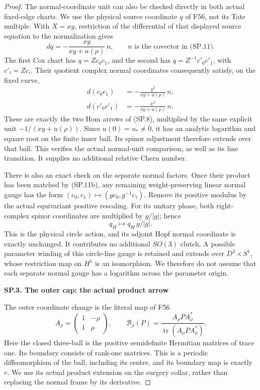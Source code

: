 \begin{proof}
The normal-coordinate unit can also be checked directly in both
actual fixed-edge charts. We use the physical source coordinate
\(q\) of F56, not its Tate multiple. With \(X=xy\), restriction
of the differential of that displayed source equation to the
normalization gives
\[
 dq=-\frac{xy}{xy+u(\rho)}\,n,
 \qquad n\text{ is the covector in (SP.11)}.              \tag{SP.11a}
\]
The first Cox chart has \(q=Zc_0c_1\), and the second has
\(q=Z^{-1}c'_0c'_1\), with \(c'_i=Zc_i\). Their quotient
complex normal coordinates consequently satisfy, on the fixed curve,
\[
 \begin{aligned}
 d(c_0c_1)&=-\frac{y^2}{xy+u(\rho)}\,n,\\
 d(c'_0c'_1)&=-\frac{x^2}{xy+u(\rho)}\,n.
 \end{aligned}                                             \tag{SP.11b}
\]
These are exactly the two Hom arrows of (SP.8), multiplied by the
same explicit unit \(-1/(xy+u(\rho))\). Since \(u(0)=u_*\ne0\),
it has an analytic logarithm and square root on the finite inner
ball. Its spinor adjustment therefore extends over that ball. This
verifies the actual normal-unit comparison, as well as its line
transition. It supplies no additional relative Chern number.

There is also an exact check on the separate normal factors. Once
their product has been matched by (SP.11b), any remaining
weight-preserving linear normal gauge has the form
\((c_0,c_1)\mapsto(g c_0,g^{-1}c_1)\). Remove its positive
modulus by the actual equivariant positive rescaling. For its unitary
phase, both right-complex spinor coordinates are multiplied by
\(g/|g|\); hence
\[
                  q_H\longmapsto q_H\,g/|g|.             \tag{SP.11c}
\]
This is the physical circle action, and its adjoint Hopf normal
coordinate is exactly unchanged. It contributes no additional
\(SO(3)\) clutch. A possible parameter winding of this circle-line
gauge is retained and extends over \(D^3\times S^1\), whose
restriction map on \(H^1\) is an isomorphism. We therefore do not
assume that each separate normal gauge has a logarithm across the
parameter origin.

\par

\medskip\noindent\textbf{SP.3. The outer cap: the actual product arrow}

\par\nobreak

The outer coordinate change is the literal map of F56
\[
 A_\rho=\begin{pmatrix}1&-\rho\\1&\rho\end{pmatrix},
 \qquad
 \mathcal B_\rho(P)=
       \frac{A_\rho P A_\rho^*}{\operatorname{tr}(A_\rho P A_\rho^*)}.
                                                               \tag{SP.12}
\]
Here the closed three-ball is the positive semidefinite Hermitian
matrices of trace one. Its boundary consists of rank-one matrices.
This is a periodic diffeomorphism of the ball, including its centre,
and its boundary map is exactly \(r\). We use its actual product
extension on the surgery collar, rather than replacing the normal
frame by its derivative.


\end{proof}
